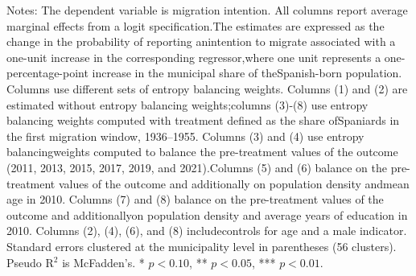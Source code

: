 \begin{table}[!h]
\caption*{\footnotesize Notes: The dependent variable is migration intention. All columns report average marginal effects from a logit specification.The estimates are expressed as the change in the probability of reporting anintention to migrate associated with a one-unit increase in the corresponding regressor,where one unit represents a one-percentage-point increase in the municipal share of theSpanish-born population. Columns use different sets of entropy balancing weights. Columns (1) and (2) are estimated without entropy balancing weights;columns (3)-(8) use entropy balancing weights computed with treatment defined as the share ofSpaniards in the first migration window, 1936–1955. Columns (3) and (4) use entropy balancingweights computed to balance the pre-treatment values of the outcome (2011, 2013, 2015, 2017, 2019, and 2021).Columns (5) and (6) balance on the pre-treatment values of the outcome and additionally on population density andmean age in 2010. Columns (7) and (8) balance on the pre-treatment values of the outcome and additionallyon population density and average years of education in 2010. Columns (2), (4), (6), and (8) includecontrols for age and a male indicator. Standard errors clustered at the municipality level in parentheses (56 clusters). Pseudo R$^2$ is McFadden's. * $p<0.10$, ** $p<0.05$, *** $p<0.01$.}
\end{table}
